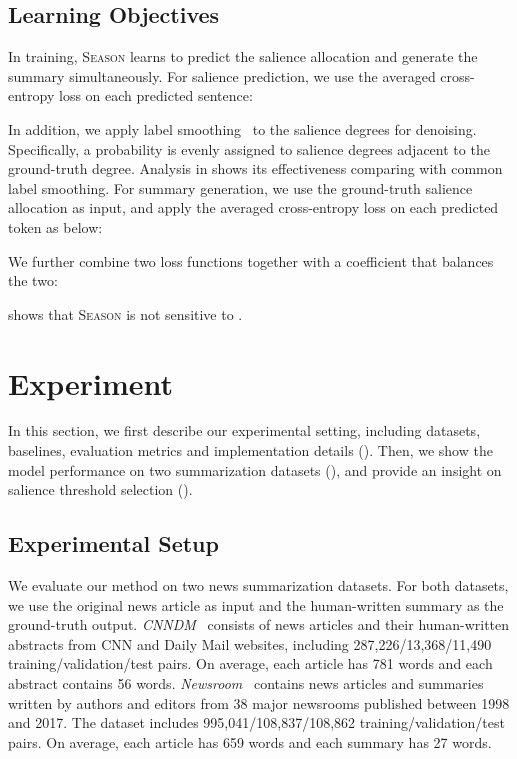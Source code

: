 \documentclass[11pt]{article}
\newcommand{\stitle}[1]{\vspace{1ex} \noindent{\bf #1.}}
\newcommand{\MODEL}{\mbox{\textsc{Season}}\xspace}
\begin{document}
\subsection{Learning Objectives}
In training, \MODEL learns to predict the salience allocation and generate the summary simultaneously.
For salience prediction, we use the averaged cross-entropy loss on each predicted sentence:
\vspace{-0.1mm}

In addition, we apply label smoothing~\cite{diaz2019soft} to the salience degrees for denoising.
Specifically, a probability  is evenly assigned to salience degrees adjacent to the ground-truth degree.
Analysis in  shows its effectiveness comparing with common label smoothing.
For summary generation, we use the ground-truth salience allocation as input, and apply the averaged cross-entropy loss on each predicted token as below:
\vspace{-0.1mm}

We further combine two loss functions together with a coefficient  that balances the two:
\vspace{-0.1mm}

 shows that \MODEL is not sensitive to . 











 \section{Experiment}
In this section, we first describe our experimental setting, including datasets, baselines, evaluation metrics and implementation details ().
Then, we show the model performance on two summarization datasets (), and provide an insight on salience threshold selection ().

\subsection{Experimental Setup}\label{sec:setup}
\stitle{Datasets} 
We evaluate our method on two news summarization datasets. For both datasets, we use the original news article as input and the human-written summary as the ground-truth output.
\textit{CNNDM}~\cite{see2017get} consists of news articles and their human-written abstracts from CNN and Daily Mail websites, including 287,226/13,368/11,490 training/validation/test pairs.
On average, each article has 781 words and each abstract contains 56 words.
\textit{Newsroom}~\cite{grusky2018newsroom} contains news articles and summaries written by authors and editors from 38 major newsrooms published between 1998 and 2017. The dataset includes 995,041/108,837/108,862 training/validation/test pairs. On average, each article has 659 words and each summary has 27 words.
\end{document}
